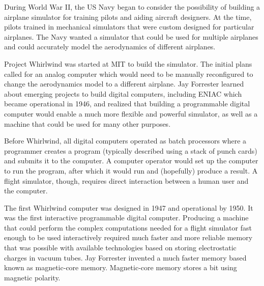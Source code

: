 \begin{schemeregion}
During World War II, the US Navy began to consider the possibility of building a airplane simulator for training pilots and aiding aircraft designers.   At the time, pilots trained in mechanical simulators that were custom designed for particular airplanes.  The Navy wanted a simulator that could be used for multiple airplanes and could accurately model the aerodynamics of different airplanes.  

Project Whirlwind was started at MIT to build the simulator.  The initial plans called for an analog computer which would need to be manually reconfigured to change the aerodynamics model to a different airplane.  Jay Forrester learned about emerging projects to build digital computers, including ENIAC which became operational in 1946, and realized that building a programmable digital computer would enable a much more flexible and powerful simulator, as well as a machine that could be used for many other purposes.  

Before Whirlwind, all digital computers operated as batch processors where a programmer creates a program (typically described using a stack of punch cards) and submits it to the computer.  A computer operator would set up the computer to run the program, after which it would run and (hopefully) produce a result.  A flight simulator, though, requires direct interaction between a human user and the computer.  

The first Whirlwind computer was designed in 1947 and operational by 1950.   %
It was the first interactive programmable digital computer.  Producing a machine that could perform the complex computations needed for a flight simulator fast enough to be used interactively required much faster and more reliable memory that was possible with available technologies based on storing electrostatic charges in vacuum tubes.  Jay Forrester invented a much faster memory based known as magnetic-core memory.  Magnetic-core memory stores a bit using magnetic polarity.


\end{schemeregion}
